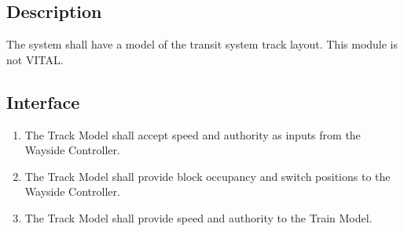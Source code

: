 \documentclass{scrreprt}
\begin{document}
\subsection{Description}
The system shall have a model of the transit system track layout. This module is not VITAL.

\subsection{Interface}
\begin{enumerate}
    \item The Track Model shall accept speed and authority as inputs from the Wayside Controller.
    \item The Track Model shall provide block occupancy and switch positions to the Wayside Controller.
    \item The Track Model shall provide speed and authority to the Train Model.
\end{enumerate}
\end{document}
